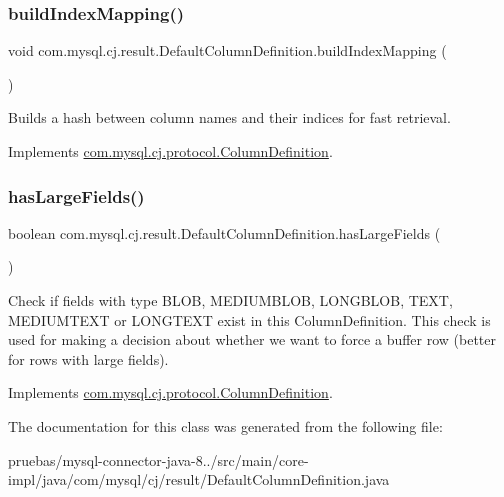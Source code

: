 \subsubsection{\texorpdfstring{build\+Index\+Mapping()}{buildIndexMapping()}}
{\footnotesize\ttfamily void com.\+mysql.\+cj.\+result.\+Default\+Column\+Definition.\+build\+Index\+Mapping (\begin{DoxyParamCaption}{ }\end{DoxyParamCaption})}

Builds a hash between column names and their indices for fast retrieval. 

Implements \mbox{\hyperlink{interfacecom_1_1mysql_1_1cj_1_1protocol_1_1_column_definition_abadc6af9b7111fa0398649fe01a43308}{com.\+mysql.\+cj.\+protocol.\+Column\+Definition}}.

\mbox{\label{classcom_1_1mysql_1_1cj_1_1result_1_1_default_column_definition_a221996852cd52bf81bd9e3ecb8ab6ff5}} 
\subsubsection{\texorpdfstring{has\+Large\+Fields()}{hasLargeFields()}}
{\footnotesize\ttfamily boolean com.\+mysql.\+cj.\+result.\+Default\+Column\+Definition.\+has\+Large\+Fields (\begin{DoxyParamCaption}{ }\end{DoxyParamCaption})}

Check if fields with type B\+L\+OB, M\+E\+D\+I\+U\+M\+B\+L\+OB, L\+O\+N\+G\+B\+L\+OB, T\+E\+XT, M\+E\+D\+I\+U\+M\+T\+E\+XT or L\+O\+N\+G\+T\+E\+XT exist in this Column\+Definition. This check is used for making a decision about whether we want to force a buffer row (better for rows with large fields). 

Implements \mbox{\hyperlink{interfacecom_1_1mysql_1_1cj_1_1protocol_1_1_column_definition_adc02edd67e54d79c7f91d41d027e44ae}{com.\+mysql.\+cj.\+protocol.\+Column\+Definition}}.



The documentation for this class was generated from the following file\+:\begin{DoxyCompactItemize}
\item 
pruebas/mysql-\/connector-\/java-\/8../src/main/core-\/impl/java/com/mysql/cj/result/Default\+Column\+Definition.\+java\end{DoxyCompactItemize}
